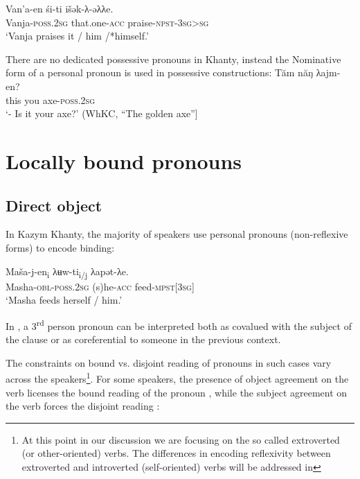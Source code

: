 \documentclass[output=paper]{langscibook}
\begin{document}
 
\ea 
\label{ex:Volkova:17}
 \gll Van’a-en śi-ti išək-λ{}-əλλe. \\
 Vanja\textsc{{}-poss.2sg} that.one\textsc{{}-acc} praise\textsc{{}-npst-3sg>sg} \\
 \glt ‘Vanja praises it / him /*himself.’ 
\z



There are no dedicated possessive pronouns in Khanty, instead the Nominative form of a personal pronoun is used in possessive constructions:
\ea 
\label{ex:Volkova:18}
 \gll Tăm năŋ λajm-en?\\
 this you axe\textsc{{}-poss.2sg}\\
 \glt ‘- Is it your axe?’ (WhKC, “The golden axe”]
\z


 

\section{{Locally} {bound} {pronouns}}\label{sec:Volkova:3}
\subsection{{Direct} {object}}\label{sec:Volkova:3.1}

In Kazym Khanty, the majority of speakers use personal pronouns (non-reflexive forms) to encode binding:

\ea 
\label{ex:Volkova:19}
 \gll Maša-j-en\textsubscript{i} λʉw-ti\textsubscript{i/j} λapət-λe.\\
 Masha\textsc{{}-}\textsc{obl-poss.2sg} (s)he-\textsc{acc} feed-\textsc{mpst[3sg]}\\
 \glt ‘Masha feeds herself / him.’
\z


In , a 3\textsuperscript{rd} person pronoun can be interpreted both as covalued with the subject of the clause or as coreferential to someone in the previous context.

The constraints on bound vs. disjoint reading of pronouns in such cases vary across the speakers\footnote{At this point in our discussion we are focusing on the so called extroverted (or other-oriented) verbs. The differences in encoding reflexivity between extroverted and introverted (self-oriented) verbs will be addressed in }. For some speakers, the presence of object agreement on the verb licenses the bound reading of the pronoun , while %
the subject agreement on the verb forces the disjoint reading :
\end{document}
